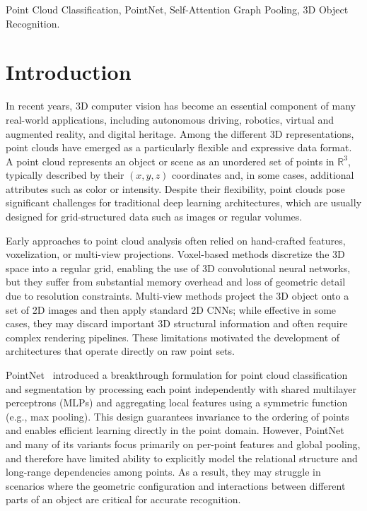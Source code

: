 \documentclass[conference]{IEEEtran}
\begin{document}
\begin{IEEEkeywords}
Point Cloud Classification, PointNet, Self-Attention Graph Pooling, 3D Object Recognition.
\end{IEEEkeywords}

\section{Introduction}


In recent years, 3D computer vision has become an essential component of many real-world applications, including autonomous driving, robotics, virtual and augmented reality, and digital heritage. Among the different 3D representations, point clouds have emerged as a particularly flexible and expressive data format. A point cloud represents an object or scene as an unordered set of points in $\mathbb{R}^3$, typically described by their $(x,y,z)$ coordinates and, in some cases, additional attributes such as color or intensity. Despite their flexibility, point clouds pose significant challenges for traditional deep learning architectures, which are usually designed for grid-structured data such as images or regular volumes.

Early approaches to point cloud analysis often relied on hand-crafted features, voxelization, or multi-view projections. Voxel-based methods discretize the 3D space into a regular grid, enabling the use of 3D convolutional neural networks, but they suffer from substantial memory overhead and loss of geometric detail due to resolution constraints. Multi-view methods project the 3D object onto a set of 2D images and then apply standard 2D CNNs; while effective in some cases, they may discard important 3D structural information and often require complex rendering pipelines. These limitations motivated the development of architectures that operate directly on raw point sets.

PointNet~\cite{b1} introduced a breakthrough formulation for point cloud classification and segmentation by processing each point independently with shared multilayer perceptrons (MLPs) and aggregating local features using a symmetric function (e.g., max pooling). This design guarantees invariance to the ordering of points and enables efficient learning directly in the point domain. However, PointNet and many of its variants focus primarily on per-point features and global pooling, and therefore have limited ability to explicitly model the relational structure and long-range dependencies among points. As a result, they may struggle in scenarios where the geometric configuration and interactions between different parts of an object are critical for accurate recognition.
\end{document}
